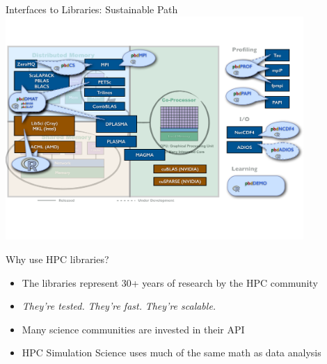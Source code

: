 \begin{frame}{\pbdR Interfaces to Libraries: Sustainable Path}
  \vspace{-1ex}
  \centering\includegraphics[trim=0cm 4.5cm 0cm 3cm,clip=true,width=0.85\textwidth]
  {../common/pics/hardware/ParallelHardware27.pdf}
  \vspace{-2mm}
  \scriptsize
  \begin{block}{Why use HPC libraries?}
    \begin{itemize}[<+-|alert@+>]
    \item The libraries represent 30+ years of research by the HPC
      community
    \item \emph{They're tested.} \emph{They're fast.}  \emph{They're
        scalable.}
    \item Many science communities are invested in their API
    \item HPC Simulation Science uses much of the same math as data
      analysis
    \end{itemize}
  \end{block}
\end{frame}


